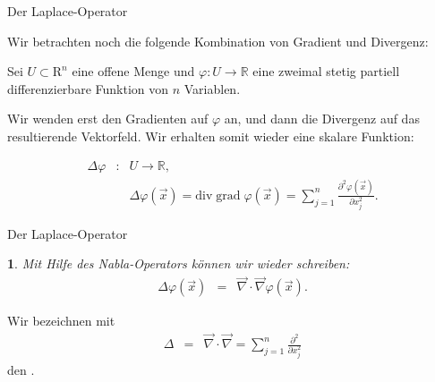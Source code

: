 \documentclass[german]{beamer}
\newcommand{\bq}{\begin{eqnarray*}}
\newcommand{\eq}{\end{eqnarray*}}
\newcommand{\superalert}[1]{{\color{MyYellowOrange}{#1}}}
\newtheorem*{myemptytheorem}{}
\begin{document}
\begin{frame}{Der Laplace-Operator}

Wir betrachten noch die folgende Kombination von Gradient und Divergenz:

\vspace*{2mm}
Sei $U \subset {\mathrm R}^n$ eine offene Menge und 
$\varphi : U \rightarrow {\mathbb R}$ eine zweimal stetig partiell differenzierbare
Funktion von $n$ Variablen.

\vspace*{2mm}
Wir wenden erst den Gradienten auf $\varphi$ an, und dann die Divergenz auf das resultierende Vektorfeld.
Wir erhalten somit wieder eine skalare Funktion:
\begin{definition}
\bq
 \Delta \varphi & : & U \rightarrow {\mathbb R},
 \nonumber \\
 & & \Delta \varphi\left(\vec{x}\right) = \mbox{div} \; \mbox{grad} \; \varphi\left(\vec{x}\right)
 = \sum\limits_{j=1}^n \frac{\partial^2 \varphi\left(\vec{x}\right)}{\partial x_j^2}.
\eq
\end{definition}

\end{frame}

\begin{frame}{Der Laplace-Operator}

\begin{myemptytheorem}
Mit Hilfe des Nabla-Operators k\"onnen wir wieder schreiben:
\bq
 \Delta \varphi\left(\vec{x}\right) & = & \vec{\nabla} \cdot \vec{\nabla} \varphi\left(\vec{x}\right).
\eq
\end{myemptytheorem}
\begin{definition}
Wir bezeichnen mit
\bq
 \Delta & = & \vec{\nabla} \cdot \vec{\nabla} 
 = \sum\limits_{j=1}^n \frac{\partial^2}{\partial x_j^2}
\eq
den \superalert{Laplace-Operator}.
\end{definition}

\end{frame}
\end{document}
